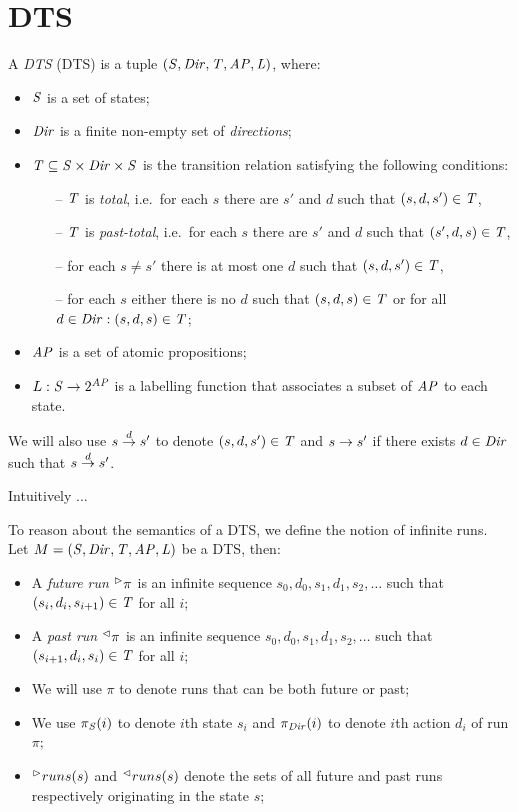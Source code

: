 \section{\Acl{DTS}}

A \emph{\acl{DTS}} (\acs{DTS}) is a tuple $(\mathit{S}, \mathit{Dir}, \mathit{T}, \mathit{AP}, \mathit{L})$, where:

\begin{itemize}
	\item $\mathit{S}$ is a set of states;
	\item $\mathit{Dir}$ is a finite non-empty set of \emph{directions};
	\item $\mathit{T} \subseteq \mathit{S} \times \mathit{Dir} \times \mathit{S}$ is the transition relation satisfying the following conditions:
	\begin{itemize}
		\item[--] $\mathit{T}$ is \emph{total}, i.e.~for each $s$ there are $s'$ and $d$ such that $(s, d,
		s')\in \mathit{T}$,
		\item[--] $\mathit{T}$ is \emph{past-total}, i.e.~for each $s$ there are $s'$ and $d$ such that
		$(s', d, s)\in \mathit{T}$,
		\item[--] for each $s \ne s'$ there is at most one $d$ such that $(s, d, s')\in \mathit{T}$,
		\item[--] for each $s$ either there is no $d$ such that $(s,d,s) \in \mathit{T}$ or
		for all $d \in \mathit{Dir}: (s,d,s) \in \mathit{T}$;
	\end{itemize}
	\item $\mathit{AP}$ is a set of atomic propositions;
	\item $L : \mathit{S} \rightarrow 2^{\mathit{AP}}$ is a labelling function that associates a subset of $\mathit{AP}$ to each state.
\end{itemize}

We will also use $s \stackrel{d}{\rightarrow} s'$ to denote $(s, d, s') \in \mathit{T}$ and $s \rightarrow s'$ if there exists $d \in \mathit{Dir}$ such that $s \stackrel{d}{\rightarrow} s'$.

Intuitively ...

To reason about the semantics of a \ac{DTS}, we define the notion of infinite runs. Let $M = (\mathit{S}, \mathit{Dir}, \mathit{T}, \mathit{AP}, \mathit{L})$ be a \ac{DTS}, then:

\begin{itemize}
	\item A \emph{future run} ${}^\vartriangleright\pi$ is an infinite sequence $s_0, d_0, s_1, d_1, s_2, \ldots$ such that $(s_i, d_{i}, s_{i+1}) \in \mathit{T}$ for all $i$;
	\item A \emph{past run} ${}^\vartriangleleft\pi$ is an infinite sequence $s_0, d_0, s_1, d_1, s_2, \ldots$ such that $(s_{i+1}, d_{i}, s_{i}) \in \mathit{T}$ for all $i$;
	\item We will use $\pi$ to denote runs that can be both future or past;
	\item We use $\pi_{\mathit{S}}(i)$ to denote $i$th state $s_i$ and $\pi_{\mathit{Dir}}(i)$ to denote $i$th action $d_i$  of run $\pi$;
	\item ${}^\vartriangleright runs(s)$ and ${}^\vartriangleleft runs(s)$ denote the sets of all future and past runs respectively originating in the state $s$;
\end{itemize}

